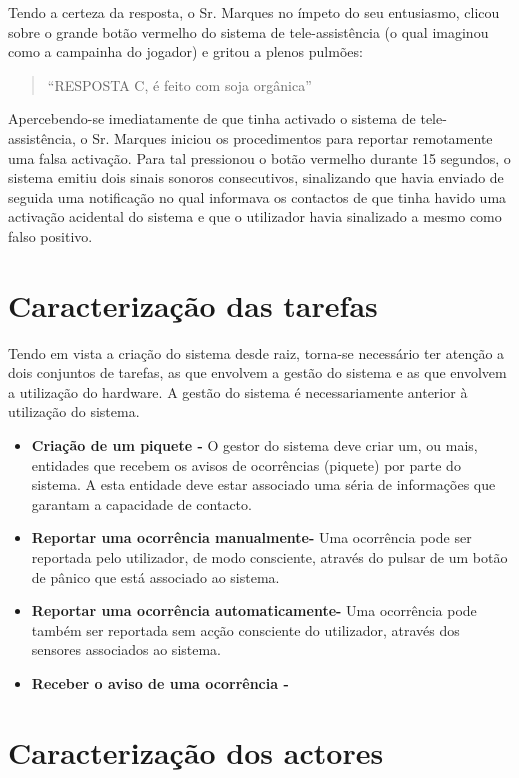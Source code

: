 Tendo a certeza da resposta, o Sr. Marques no ímpeto do seu entusiasmo, clicou sobre o grande botão vermelho do sistema de tele-assistência (o qual imaginou como a campainha do jogador) e gritou a plenos pulmões:
\begin{quote}
	“RESPOSTA C, é feito com soja orgânica”
\end{quote}

Apercebendo-se imediatamente de que tinha activado o sistema de tele-assistência, o Sr. Marques iniciou os procedimentos para reportar remotamente uma falsa activação. Para tal pressionou o botão vermelho durante 15 segundos, o sistema emitiu dois sinais sonoros consecutivos, sinalizando que havia enviado de seguida uma notificação no qual informava os contactos de que tinha havido uma activação acidental do sistema e que o utilizador havia sinalizado a mesmo como falso positivo. 

\section{Caracterização das tarefas}

Tendo em vista a criação do sistema desde raiz, torna-se necessário ter atenção a dois conjuntos de tarefas, as que envolvem a gestão do sistema e as que envolvem a utilização do hardware. A gestão do sistema é necessariamente anterior à utilização do sistema.
\begin{itemize}
	\item\textbf{Criação de um piquete -} O gestor do sistema deve criar um, ou mais, entidades que recebem os avisos de ocorrências (piquete) por parte do sistema. A esta entidade deve estar associado uma séria de informações que garantam a capacidade de contacto. 
	
	\item\textbf{Reportar uma ocorrência manualmente-} Uma ocorrência pode ser reportada pelo utilizador, de modo consciente, através do pulsar de um botão de pânico que está associado ao sistema.
	
	\item\textbf{Reportar uma ocorrência automaticamente-} Uma ocorrência pode também ser reportada sem acção consciente do utilizador, através dos sensores associados ao sistema. 
	
	\item\textbf{Receber o aviso de uma ocorrência - }
\end{itemize}

\section{Caracterização dos actores}

